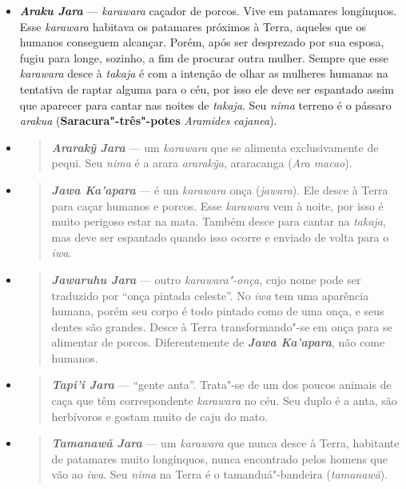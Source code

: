 \begin{itemize}
\item
  \emph{\textbf{Araku Jara}} --- \emph{karawara} caçador de porcos. Vive
  em patamares longínquos. Esse \emph{karawara} habitava os patamares
  próximos à Terra, aqueles que os humanos conseguem alcançar. Porém,
  após ser desprezado por sua esposa, fugiu para longe, sozinho, a fim
  de procurar outra mulher. Sempre que esse \emph{karawara} desce à
  \emph{takaja} é com a intenção de olhar as mulheres humanas na
  tentativa de raptar alguma para o céu, por isso ele deve ser espantado
  assim que aparecer para cantar nas noites de \emph{takaja}. Seu
  \emph{nima} terreno é o pássaro \emph{arakua}
  (\textbf{Saracura"-três"-potes} \emph{Aramides} \emph{cajanea}).
\item
  \begin{quote}
  \textbf{\emph{Ararakỹ} \emph{Jara}} --- um \emph{karawara} que se
  alimenta exclusivamente de pequi. Seu \emph{nima} é a arara
  \emph{ararakỹa}, araracanga (\emph{Ara macao}).
  \end{quote}
\item
  \begin{quote}
  \emph{\textbf{Jawa Ka'apara}} --- é um \emph{karawara} onça
  (\emph{jawara}). Ele desce à Terra para caçar humanos e porcos. Esse
  \emph{karawara} vem à noite, por isso é muito perigoso estar na mata.
  Também desce para cantar na \emph{takaja}, mas deve ser espantado
  quando isso ocorre e enviado de volta para o \emph{iwa}.
  \end{quote}
\item
  \begin{quote}
  \emph{\textbf{Jawaruhu Jara}} --- outro \emph{karawara"-onça}, cujo nome
  pode ser traduzido por ``onça pintada celeste''. No \emph{iwa} tem uma
  aparência humana, porém seu corpo é todo pintado como de uma onça, e
  seus dentes são grandes. Desce à Terra transformando"-se em onça para
  se alimentar de porcos. Diferentemente de \emph{\textbf{Jawa
  Ka'apara}}, não come humanos.
  \end{quote}
\item
  \begin{quote}
  \emph{\textbf{Tapi'i Jara}} --- ``gente anta''. Trata"-se de um dos
  poucos animais de caça que têm correspondente \emph{karawara} no céu.
  Seu duplo é a anta, são herbívoros e gostam muito de caju do mato.
  \end{quote}
\item
  \begin{quote}
  \emph{\textbf{Tamanawã Jara}} --- um \emph{karawara} que nunca desce à
  Terra, habitante de patamares muito longínquos, nunca encontrado pelos
  homens que vão ao \emph{iwa}. Seu \emph{nima} na Terra é o
  tamanduá"-bandeira (\emph{tamanawã}).
  \end{quote}
\end{itemize}

